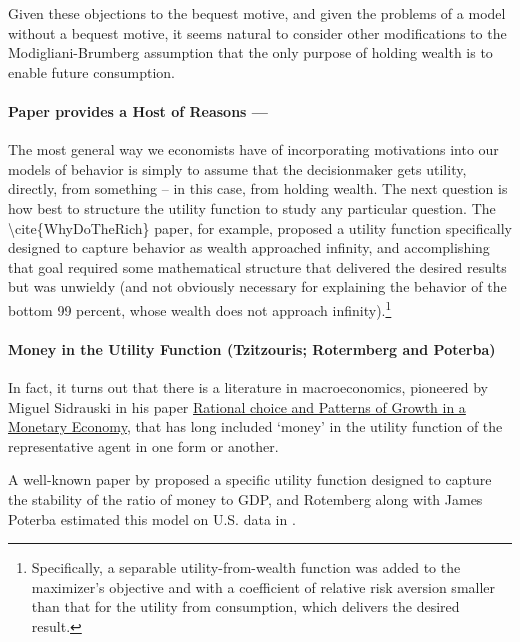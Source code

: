 \documentclass{article}
\begin{document}
Given these objections to the bequest motive, and given the problems of a model without a bequest motive, it seems natural to consider other modifications to the Modigliani-Brumberg assumption that the only purpose of holding wealth is to enable future consumption.

\paragraph{Paper provides a Host of Reasons ---}


The most general way we economists have of incorporating motivations into our models of behavior is simply to assume that the decisionmaker gets utility, directly, from something -- in this case, from holding wealth. The next question is how best to structure the utility function to study any particular question. The {\textbackslash}cite\{WhyDoTheRich\} paper, for example, proposed a utility function specifically designed to capture behavior as wealth approached infinity, and accomplishing that goal required some mathematical structure that delivered the desired results but was unwieldy (and not obviously necessary for explaining the behavior of the bottom 99 percent, whose wealth does not approach infinity).\footnote{Specifically, a separable utility-from-wealth function was added to the maximizer's objective and with a coefficient of relative risk aversion smaller than that for the utility from consumption, which delivers the desired result.}

\paragraph{Money in the Utility Function (Tzitzouris; Rotermberg and Poterba)}

In fact, it turns out that there is a literature in macroeconomics, pioneered by Miguel Sidrauski in his paper \href{}{Rational choice and Patterns of Growth in a Monetary Economy}, that has long included `money' in the utility function of the representative agent in one form or another.

A well-known paper by \cite{Rotemberg_1984} proposed a specific utility function designed to capture the stability of the ratio of money to GDP, and Rotemberg along with James Poterba estimated this model on U.S. data in \cite{Poterba_1986}.
\end{document}
